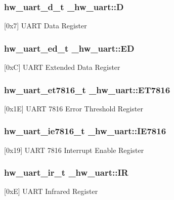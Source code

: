\subsubsection[{\texorpdfstring{D}{D}}]{ {\bf hw\+\_\+uart\+\_\+d\+\_\+t} \+\_\+hw\+\_\+uart\+::D}\hypertarget{struct__hw__uart_a9f7f95f736545dbdb0846efe768b2fbc}{}\label{struct__hw__uart_a9f7f95f736545dbdb0846efe768b2fbc}
\mbox{[}0x7\mbox{]} U\+A\+RT Data Register 
\subsubsection[{\texorpdfstring{ED}{ED}}]{ {\bf hw\+\_\+uart\+\_\+ed\+\_\+t} \+\_\+hw\+\_\+uart\+::\+ED}\hypertarget{struct__hw__uart_a4dde4edf0bb62cba85e909c4de951fce}{}\label{struct__hw__uart_a4dde4edf0bb62cba85e909c4de951fce}
\mbox{[}0xC\mbox{]} U\+A\+RT Extended Data Register 
\subsubsection[{\texorpdfstring{E\+T7816}{ET7816}}]{ {\bf hw\+\_\+uart\+\_\+et7816\+\_\+t} \+\_\+hw\+\_\+uart\+::\+E\+T7816}\hypertarget{struct__hw__uart_a44953ffb05f49777369ccd56d3af8a04}{}\label{struct__hw__uart_a44953ffb05f49777369ccd56d3af8a04}
\mbox{[}0x1E\mbox{]} U\+A\+RT 7816 Error Threshold Register 
\subsubsection[{\texorpdfstring{I\+E7816}{IE7816}}]{ {\bf hw\+\_\+uart\+\_\+ie7816\+\_\+t} \+\_\+hw\+\_\+uart\+::\+I\+E7816}\hypertarget{struct__hw__uart_a93484f33c5a1502067364dfcd2c96fbf}{}\label{struct__hw__uart_a93484f33c5a1502067364dfcd2c96fbf}
\mbox{[}0x19\mbox{]} U\+A\+RT 7816 Interrupt Enable Register 
\subsubsection[{\texorpdfstring{IR}{IR}}]{ {\bf hw\+\_\+uart\+\_\+ir\+\_\+t} \+\_\+hw\+\_\+uart\+::\+IR}\hypertarget{struct__hw__uart_a2b214327856f406243cae960a94b73d5}{}\label{struct__hw__uart_a2b214327856f406243cae960a94b73d5}
\mbox{[}0xE\mbox{]} U\+A\+RT Infrared Register 
